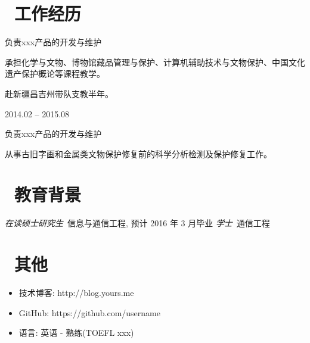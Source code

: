 \documentclass{resume}
\begin{document}
\section{\faUsers\ 工作经历}
\begin{onehalfspacing}
负责xxx产品的开发与维护
    \begin{itemize}
      \begin{large}
        \item 承担化学与文物、博物馆藏品管理与保护、计算机辅助技术与文物保护、中国文化遗产保护概论等课程教学。
        \item 赴新疆昌吉州带队支教半年。
      \end{large}
    \end{itemize}
\end{onehalfspacing}

 {2014.02 -- 2015.08}
\begin{onehalfspacing}
负责xxx产品的开发与维护
    \begin{itemize}
        \begin{large}
          \item 从事古旧字画和金属类文物保护修复前的科学分析检测及保护修复工作。
          \end{large}
        \end{itemize}
\end{onehalfspacing}

\section{\faGraduationCap\  教育背景}
\textit{在读硕士研究生}\ 信息与通信工程, 预计 2016 年 3 月毕业
\textit{学士}\ 通信工程

\section{\faInfo\ 其他}
\begin{itemize}[parsep=0.5ex]
  \item 技术博客: http://blog.yours.me
  \item GitHub: https://github.com/username
  \item 语言: 英语 - 熟练(TOEFL xxx)
\end{itemize}

%
%
\end{document}
